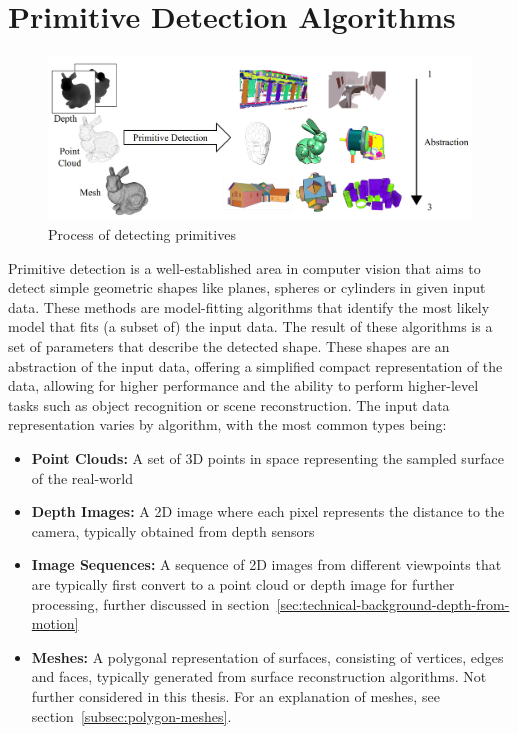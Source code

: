 \chapter{Primitive Detection Algorithms}\label{ch:primitive-detection-algorithms}

\begin{figure}[ht!]
    \centering
    \includegraphics[width=\linewidth]{images/primitive_detection}
    \caption{Process of detecting primitives \cite{kaiser_survey_2019}}
    \label{fig:primitive_detection}
\end{figure}
Primitive detection is a well-established area in computer vision that aims to detect simple geometric shapes
like planes, spheres or cylinders in given input data.
These methods are model-fitting algorithms that identify the most likely model that fits (a subset of) the input data.
The result of these algorithms is a set of parameters that describe the detected shape.
These shapes are an abstraction of the input data, offering a simplified compact representation of the data,
allowing for higher performance and the ability to perform higher-level tasks such as object recognition or scene reconstruction.
The input data representation varies by algorithm, with the most common types being:
\begin{itemize}
    \item \textbf{Point Clouds:} A set of 3D points in space representing the sampled surface of the real-world
    \item \textbf{Depth Images:} A 2D image where each pixel represents the distance to the camera, typically obtained from depth sensors
    \item \textbf{Image Sequences:} A sequence of 2D images from different viewpoints that are typically first convert to a point cloud or depth image for further processing, further discussed in section~\ref{sec:technical-background-depth-from-motion}
    \item \textbf{Meshes:} A polygonal representation of surfaces, consisting of vertices, edges and faces, typically generated from surface reconstruction algorithms.
    Not further considered in this thesis.
    For an explanation of meshes, see section~\ref{subsec:polygon-meshes}.~\cite{kaiser_survey_2019}
\end{itemize}

